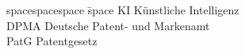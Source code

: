 
\begin{tabbing}
spacespacespace \= space \kill
KI	 \> 	Künstliche Intelligenz	 \\
DPMA \>Deutsche Patent- und Markenamt \\
PatG \> Patentgesetz \\

\end{tabbing}
\endinput

